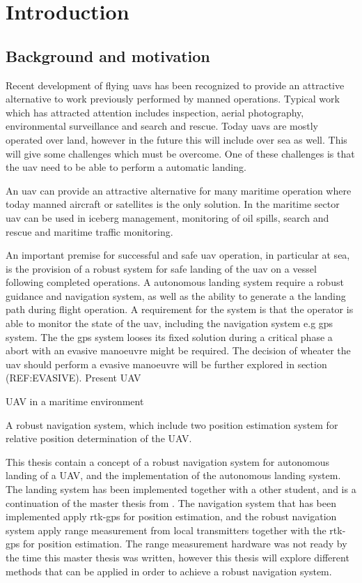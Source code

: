 
\chapter{Introduction}

\section{Background and motivation}
Recent development of flying \glspl{uav} has been recognized to provide an attractive alternative to work previously performed by manned operations. Typical work which has attracted attention includes inspection, aerial photography, environmental surveillance and search and rescue. Today \glspl{uav} are mostly operated over land, however in the future this will include over sea as well. This will give some challenges which must be overcome. One of these challenges is that the \gls{uav} need to be able to perform a automatic landing.

An \gls{uav} can provide an attractive alternative for many maritime operation where today manned aircraft or satellites is the only solution. In the maritime sector \gls{uav} can be used in iceberg management, monitoring of oil spills, search and rescue and maritime traffic monitoring.

An important premise for successful and safe \gls{uav} operation, in particular at sea, is the provision of a robust system for safe landing of the \gls{uav} on a vessel following completed operations. A autonomous landing system require a robust guidance and navigation system, as well as the ability to generate a the landing path during flight operation. A requirement for the system is that the operator is able to monitor the state of the uav, including the navigation system e.g gps system. The the gps system looses its fixed solution during a critical phase a abort with an evasive manoeuvre might be required. The decision of wheater the uav should perform a evasive manoeuvre will be further explored in section (REF:EVASIVE).
Present UAV

UAV in a maritime environment

A robust navigation system, which include two position estimation system for relative position determination of the UAV. 

This thesis contain a concept of a robust navigation system for autonomous landing of a UAV, and the implementation of the autonomous landing system. The landing system has been implemented together with a other student, and is a continuation of the master thesis from \citep{Froelich}. The navigation system that has been implemented apply rtk-gps for position estimation, and the robust navigation system apply range measurement from local transmitters together with the rtk-gps for position estimation. The range measurement hardware was not ready by the time this master thesis was written, however this thesis will explore different methods that can be applied in order to achieve a robust navigation system.

